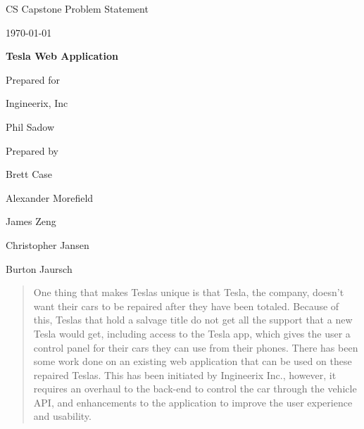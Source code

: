 \documentclass[onecolumn, draftclsnofoot,10pt, compsoc]{IEEEtran}
\def \CapstoneTeamName{                 The Cleverly Named Team}
\def \CapstoneTeamNumber{               22}
\def \GroupMemberOne{                   Brett Case}
\def \GroupMemberTwo{                   Alexander Morefield}
\def \GroupMemberThree{                 James Zeng}
\def \GroupMemberFour{                  Christopher Jansen}
\def \GroupMemberFive{                  Burton Jaursch}
\def \CapstoneProjectName{              Tesla Web Application}
\def \CapstoneSponsorCompany{           Ingineerix, Inc}
\def \CapstoneSponsorPerson{            Phil Sadow}
\def \DocType{          Problem Statement
                                }
\newcommand{\NameSigPair}[1]{\par
\makebox[2.75in][r]{#1} \hfil   \makebox[3.25in]{\makebox[2.25in]{\hrulefill} \hfill            \makebox[.75in]{\hrulefill}}
\par\vspace{-12pt} \textit{\tiny\noindent
\makebox[2.75in]{} \hfil                \makebox[3.25in]{\makebox[2.25in][r]{Signature} \hfill  \makebox[.75in][r]{Date}}}}
\renewcommand{\NameSigPair}[1]{#1}
\begin{document}
\begin{titlepage}
    \begin{singlespace}
        \hfill
        \par\vspace{.2in}
        \centering
        \scshape{
            \huge CS Capstone \DocType \par
            {\large\today}\par
            \vspace{.5in}
            \textbf{\Huge\CapstoneProjectName}\par
            \vfill

            \vfill
            {\large Prepared for}\par
            \Huge \CapstoneSponsorCompany\par
            \vspace{5pt}
            {\Large\NameSigPair{\CapstoneSponsorPerson}\par}
            {\large Prepared by }\par
            \vspace{5pt}
            {\Large
                \NameSigPair{\GroupMemberOne}\par
                \NameSigPair{\GroupMemberTwo}\par
                \NameSigPair{\GroupMemberThree}\par
                \NameSigPair{\GroupMemberFour}\par
                \NameSigPair{\GroupMemberFive}\par
            }
            \vspace{20pt}
        }
        \begin{abstract}
        One thing that makes Teslas unique is that Tesla, the company, doesn't want their cars to be repaired after they have been totaled.
        Because of this, Teslas that hold a salvage title do not get all the support that a new Tesla would get, including access to the Tesla app, which gives the user a control panel for their cars they can use from their phones.
        There has been some work done on an existing web application that can be used on these repaired Teslas.
        This has been initiated by Ingineerix Inc., however, it requires an overhaul to the back-end to control the car through the vehicle API, and enhancements to the application to improve the user experience and usability.
        \end{abstract}
    \end{singlespace}
\end{titlepage}
\newpage
{}
\tableofcontents
\clearpage
\end{document}
